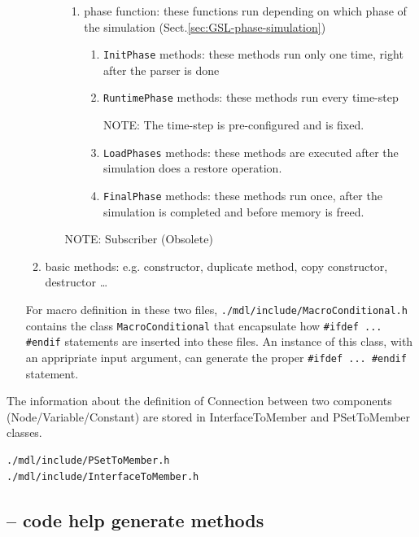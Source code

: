 \begin{itemize}
\begin{enumerate}
\begin{itemize}
\begin{enumerate}
     
     \item phase function: these functions run depending on which phase of the
     simulation (Sect.\ref{sec:GSL-phase-simulation})
     
   \begin{enumerate}
     \item \verb!InitPhase! methods:
     these methods run only one time, right after the parser is done
     
     \item \verb!RuntimePhase! methods: 
     these methods run every time-step
    
     NOTE: The time-step is pre-configured and is fixed.
     
     \item \verb!LoadPhases! methods:
     these methods are executed after the simulation does a restore operation.
     
     \item \verb!FinalPhase! methods:
     these methods run once, after the simulation is completed and before memory
     is freed.
     

   \end{enumerate}
 \end{enumerate}
   NOTE: Subscriber (Obsolete)
   
 \end{itemize}

 
    \item basic methods: e.g. constructor, duplicate method, copy constructor,
    destructor \ldots
  \end{enumerate}

For macro definition in these two files, 
\verb!./mdl/include/MacroConditional.h! contains the class
\verb!MacroConditional! that encapsulate how 
\verb!#ifdef ... #endif! statements are inserted into these files.
An instance of this class, with an appripriate input argument, can generate the
proper \verb!#ifdef ... #endif! statement.

\end{itemize}


The information about the definition of Connection between two components
(Node/Variable/Constant) are stored in InterfaceToMember and
PSetToMember classes.
\begin{verbatim}
./mdl/include/PSetToMember.h
./mdl/include/InterfaceToMember.h
\end{verbatim}

 
 \subsection{-- code help generate methods}
 
